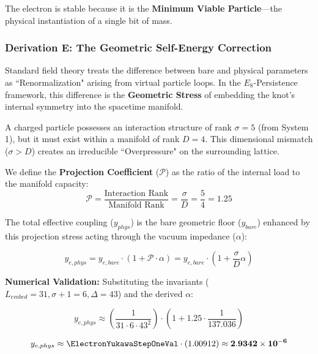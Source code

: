 The electron is stable because it is the \textbf{Minimum Viable Particle}—the physical instantiation of a single bit of mass.

\subsubsection{Derivation E: The Geometric Self-Energy Correction}

Standard field theory treats the difference between bare and physical parameters as ``Renormalization" arising from virtual particle loops. In the $E_8$-Persistence framework, this difference is the \textbf{Geometric Stress} of embedding the knot's internal symmetry into the spacetime manifold.

A charged particle possesses an interaction structure of rank $\sigma=5$ (from System 1), but it must exist within a manifold of rank $D=4$. This dimensional mismatch ($\sigma > D$) creates an irreducible ``Overpressure" on the surrounding lattice.

We define the \textbf{Projection Coefficient} ($\mathcal{P}$) as the ratio of the internal load to the manifold capacity:
\begin{equation}
\mathcal{P} = \frac{\text{Interaction Rank}}{\text{Manifold Rank}} = \frac{\sigma}{D} = \frac{5}{4} = 1.25
\end{equation}

The total effective coupling ($y_{phys}$) is the bare geometric floor ($y_{bare}$) enhanced by this projection stress acting through the vacuum impedance ($\alpha$):

\begin{equation}
y_{e,phys} = y_{e,bare} \cdot \left(1 + \mathcal{P} \cdot \alpha \right) = y_{e,bare} \cdot \left(1 + \frac{\sigma}{D}\alpha \right)
\end{equation}

\textbf{Numerical Validation:}
Substituting the invariants ($L_{embed}=31, \sigma+1=6, \Delta=43$) and the derived $\alpha$:

\begin{equation}
y_{e,phys} \approx \left(\frac{1}{31 \cdot 6 \cdot 43^2}\right) \cdot \left(1 + 1.25 \cdot \frac{1}{137.036}\right)
\end{equation}

\begin{equation}
y_{e,phys} \approx \ElectronYukawaStepOneVal \cdot (1.00912) \approx \mathbf{2.9342 \times 10^{-6}}
\end{equation}

